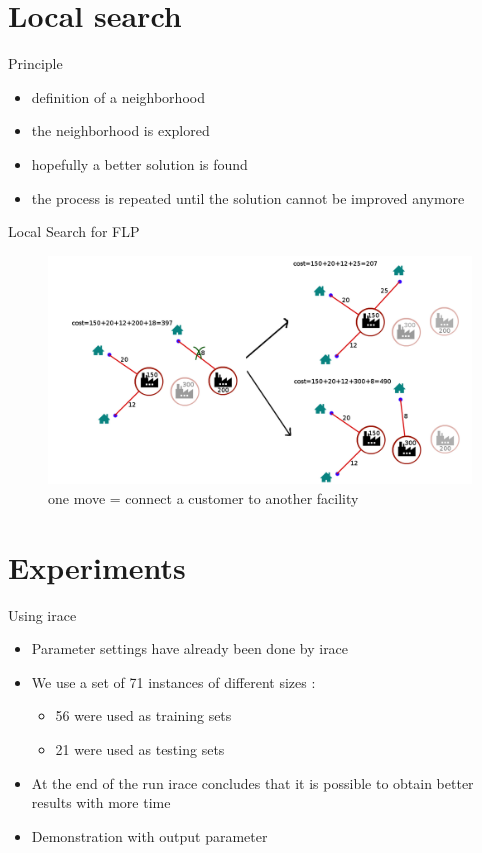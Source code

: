 \documentclass{beamer}
\begin{document}
\section{Local search}

\begin{frame}{Principle}
    \begin{itemize}
        \item definition of a neighborhood
        \item the neighborhood is explored
        \item hopefully a better solution is found
        \item the process is repeated until the solution cannot be improved anymore
    \end{itemize}
\end{frame}

\begin{frame}{Local Search for FLP}
    \begin{figure}
        \centering
        \includegraphics[scale=0.27]{schemalstot}
        \caption{ one move = connect a customer to another facility}
    \end{figure}
\end{frame}

\section{Experiments}

\begin{frame}{Using irace}
\begin{itemize}
\item
Parameter settings have already been done by irace
\item
We use a set of 71 instances of different sizes :
\begin{itemize}
\item
56 were used as training sets
\item
21 were used as testing sets
\end{itemize}
\item
At the end of the run irace concludes that it is possible to obtain better results with more time
\item<2->
Demonstration with output parameter
\end{itemize}
\end{frame}
\end{document}
